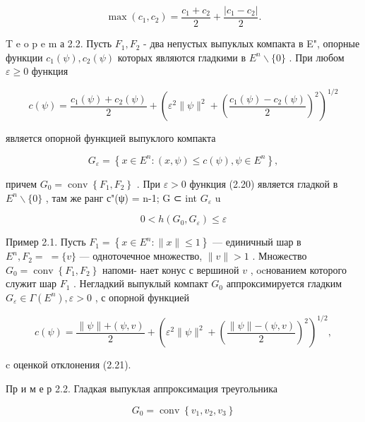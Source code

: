\documentclass[10pt]{article}
\begin{document}
\[
\max \left( {{c}_{1},{c}_{2}}\right)  = \frac{{c}_{1} + {c}_{2}}{2} + \frac{\left| {c}_{1} - {c}_{2}\right| }{2}.
\]

T e o p e m а 2.2. Пусть \({F}_{1},{F}_{2}\) - два непустых выпуклых компакта в E", опорные функции \({c}_{1}\left( \psi \right) ,{c}_{2}\left( \psi \right)\) которых являются гладкими в \({E}^{n} \smallsetminus  \{ 0\}\) . При любом \(\varepsilon  \geq  0\) функция

\[
c\left( \psi \right)  = \frac{{c}_{1}\left( \psi \right)  + {c}_{2}\left( \psi \right) }{2} + {\left( {\varepsilon }^{2}\parallel \psi {\parallel }^{2} + {\left( \frac{{c}_{1}\left( \psi \right)  - {c}_{2}\left( \psi \right) }{2}\right) }^{2}\right) }^{1/2} \tag{2.20}
\]

является опорной функцией выпуклого компакта

\[
{G}_{\varepsilon } = \left\{  {x \in  {E}^{n} : \left( {x,\psi }\right)  \leq  c\left( \psi \right) ,\psi  \in  {E}^{n}}\right\}  ,
\]

причем \({G}_{0} = \operatorname{conv}\left\{  {{F}_{1},{F}_{2}}\right\}\) . При \(\varepsilon  > 0\) функция (2.20) является гладкой в \({E}^{n} \smallsetminus  \{ 0\}\) , там же ранг с"(ψ) = n-1; G ⊂ int \({G}_{\varepsilon }\) u

\[
0 < h\left( {{G}_{0},{G}_{\varepsilon }}\right)  \leq  \varepsilon \tag{2.21}
\]

Пример 2.1. Пусть \({F}_{1} = \left\{  {x \in  {E}^{n} : \parallel x\parallel  \leq  1}\right\}\) — единичный шар в \({E}^{n},{F}_{2} = \; = \{ v\}\) — одноточечное множество, \(\parallel v\parallel  > 1\) . Множество \({G}_{0} = \operatorname{conv}\left\{  {{F}_{1},{F}_{2}}\right\}\) напоми- нает конус с вершиной \(v\) , ocнованием которого служит шар \({F}_{1}\) . Негладкий выпуклый компакт \({G}_{0}\) аппроксимируется гладким \({G}_{\varepsilon } \in  \Gamma \left( {E}^{n}\right) ,\varepsilon  > 0\) , с опорной функцией

\[
c\left( \psi \right)  = \frac{\parallel \psi \parallel  + \left( {\psi ,v}\right) }{2} + {\left( {\varepsilon }^{2}\parallel \psi {\parallel }^{2} + {\left( \frac{\parallel \psi \parallel  - \left( {\psi ,v}\right) }{2}\right) }^{2}\right) }^{1/2},
\]

c оценкой отклонения (2.21).

Пр и м е р 2.2. Гладкая выпуклая аппроксимация треугольника

\[
{G}_{0} = \operatorname{conv}\left\{  {{v}_{1},{v}_{2},{v}_{3}}\right\}
\]
\end{document}
